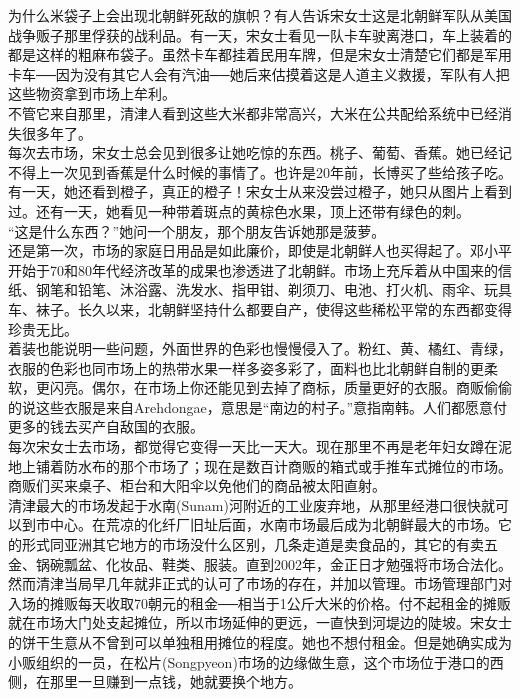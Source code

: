 为什么米袋子上会出现北朝鲜死敌的旗帜？有人告诉宋女士这是北朝鲜军队从美国战争贩子那里俘获的战利品。有一天，宋女士看见一队卡车驶离港口，车上装着的都是这样的粗麻布袋子。虽然卡车都挂着民用车牌，但是宋女士清楚它们都是军用卡车──因为没有其它人会有汽油──她后来估摸着这是人道主义救援，军队有人把这些物资拿到市场上牟利。\\

不管它来自那里，清津人看到这些大米都非常高兴，大米在公共配给系统中已经消失很多年了。\\

每次去市场，宋女士总会见到很多让她吃惊的东西。桃子、葡萄、香蕉。她已经记不得上一次见到香蕉是什么时候的事情了。也许是20年前，长博买了些给孩子吃。有一天，她还看到橙子，真正的橙子！宋女士从来没尝过橙子，她只从图片上看到过。还有一天，她看见一种带着斑点的黄棕色水果，顶上还带有绿色的刺。\\

“这是什么东西？”她问一个朋友，那个朋友告诉她那是菠萝。\\

还是第一次，市场的家庭日用品是如此廉价，即使是北朝鲜人也买得起了。邓小平开始于70和80年代经济改革的成果也渗透进了北朝鲜。市场上充斥着从中国来的信纸、钢笔和铅笔、沐浴露、洗发水、指甲钳、剃须刀、电池、打火机、雨伞、玩具车、袜子。长久以来，北朝鲜坚持什么都要自产，使得这些稀松平常的东西都变得珍贵无比。\\

着装也能说明一些问题，外面世界的色彩也慢慢侵入了。粉红、黄、橘红、青绿，衣服的色彩也同市场上的热带水果一样多姿多彩了，面料也比北朝鲜自制的更柔软，更闪亮。偶尔，在市场上你还能见到去掉了商标，质量更好的衣服。商贩偷偷的说这些衣服是来自Arehdongae，意思是“南边的村子。”意指南韩。人们都愿意付更多的钱去买产自敌国的衣服。\\

每次宋女士去市场，都觉得它变得一天比一天大。现在那里不再是老年妇女蹲在泥地上铺着防水布的那个市场了；现在是数百计商贩的箱式或手推车式摊位的市场。商贩们买来桌子、柜台和大阳伞以免他们的商品被太阳直射。\\

清津最大的市场发起于水南(Sunam)河附近的工业废弃地，从那里经港口很快就可以到市中心。在荒凉的化纤厂旧址后面，水南市场最后成为北朝鲜最大的市场。它的形式同亚洲其它地方的市场没什么区别，几条走道是卖食品的，其它的有卖五金、锅碗瓢盆、化妆品、鞋类、服装。直到2002年，金正日才勉强将市场合法化。然而清津当局早几年就非正式的认可了市场的存在，并加以管理。市场管理部门对入场的摊贩每天收取70朝元的租金──相当于1公斤大米的价格。付不起租金的摊贩就在市场大门处支起摊位，所以市场延伸的更远，一直快到河堤边的陡坡。宋女士的饼干生意从不曾到可以单独租用摊位的程度。她也不想付租金。但是她确实成为小贩组织的一员，在松片(Songpyeon)市场的边缘做生意，这个市场位于港口的西侧，在那里一旦赚到一点钱，她就要换个地方。\\

